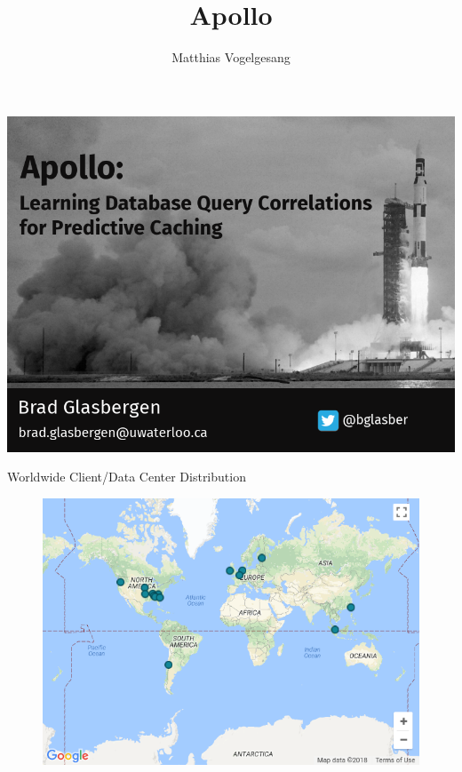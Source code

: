 \documentclass[10pt]{beamer}
\title{Apollo}
\date{}
\author{Matthias Vogelgesang}
\institute{Center for modern beamer themes}
\begin{document}
\begin{frame}{}
\vspace*{-0.2cm}
\hspace*{-1.07cm}
\includegraphics[keepaspectratio=true,width=1.03\paperwidth]{title_slide}
\end{frame}

\begin{frame}{Worldwide Client/Data Center Distribution}
    \begin{figure}
        \center
        \includegraphics[scale=0.45]{apollo_google_dc}
    \end{figure}
\end{frame}
\end{document}
